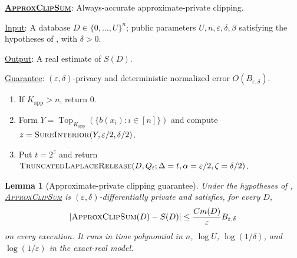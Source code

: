 \documentclass[11pt]{article}
\newenvironment{fminipage}%
  {\begin{Sbox}\begin{minipage}}%
  {\end{minipage}\end{Sbox}\fbox{\TheSbox}}
\newenvironment{algbox}[0]{%
\vskip 0.2in
\noindent
\begin{fminipage}{6.3in}
}{%
\end{fminipage}
\vskip 0.2in
}
\newtheorem{lemma}{Lemma}[section]
\begin{document}
\begin{algbox}
\textbf{\uline{\textsc{ApproxClipSum}}}: Always-accurate
approximate-private clipping.  \label{alg:approx-clip-sum}

\uline{Input}: A database $D\in\{0,\ldots,U\}^n$; public parameters
$U,n,\varepsilon,\delta,\beta$ satisfying the hypotheses of
, with $\delta>0$.

\uline{Output}: A real estimate of $S(D)$.

\uline{Guarantee}: $(\varepsilon,\delta)$-privacy and deterministic
normalized error $O(B_{\varepsilon,\delta})$.

\begin{enumerate}[leftmargin=*,nosep]
  \item If $K_{\mathrm{app}}>n$, return $0$.
  \item Form
  $Y=\operatorname{Top}_{K_{\mathrm{app}}}
     (\{b(x_i):i\in[n]\})$ and compute
  $z=\text{\textsc{SureInterior}}(Y,\varepsilon/2,\delta/2)$.
  \item Put $t=2^z$ and return
  $\text{\textsc{TruncatedLaplaceRelease}}
  (D,Q_t;\Delta=t,\alpha=\varepsilon/2,\zeta=\delta/2)$.
\end{enumerate}
\end{algbox}

\begin{lemma}[Approximate-private clipping guarantee]
\label{lem:approx-upper}
Under the hypotheses of ,
\hyperref[alg:approx-clip-sum]{\textsc{ApproxClipSum}} is
$(\varepsilon,\delta)$-differentially private and satisfies, for every $D$,
\[
 |\text{\textsc{ApproxClipSum}}(D)-S(D)|
 \le\frac{C m(D)}\varepsilon B_{\varepsilon,\delta}
\]
on every execution.  It runs in time polynomial in
$n$, $\log U$, $\log(1/\delta)$, and $\log(1/\varepsilon)$ in the exact-real
model.
\end{lemma}
\end{document}
